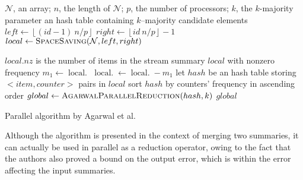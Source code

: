 \documentclass[final,3p,times]{elsarticle}
\begin{document}
\begin{algorithm}
\begin{algorithmic}[1]
\Require $\mathcal{N}$, an array; $n$, the length of $\mathcal{N}$; $p$, the number of processors; $k$, the $k$-majority parameter
\Ensure an hash table containing $k$--majority candidate elements
\State $left \leftarrow \left\lfloor {(id-1)~n/p} \right\rfloor$
\State $right \leftarrow \left\lfloor {id~n/p} \right\rfloor  - 1$
\State $local \leftarrow \Call{SpaceSaving}{\mathcal{N}, left, right}$

	 \Comment $local.nz$ is the number of items in the stream summary $local$ with nonzero frequency
		\State $m_1 \leftarrow \mathop {local[1].\hat{f}}$
			\State $\mathop {local[i].\hat{f}} \leftarrow \mathop {local[i].\hat{f}} - m_1$
		\EndFor
	\EndIf
\State let $hash$ be an hash table storing $<item, counter>$ pairs in $local$
\State sort $hash$ by counters' frequency in ascending order
\State $global \leftarrow \Call{AgarwalParallelReduction}{hash, k}$
 
	\State \Return $global$
\EndIf
\EndProcedure
\caption{Parallel algorithm by Agarwal et al.}
\label{pa}
\end{algorithmic}
\end{algorithm}

Although the algorithm is presented in the context of merging two summaries, it can actually be used in parallel as a reduction operator, owing to the fact that the authors also proved a bound on the output error, which is within the error affecting the input summaries.
\end{document}

